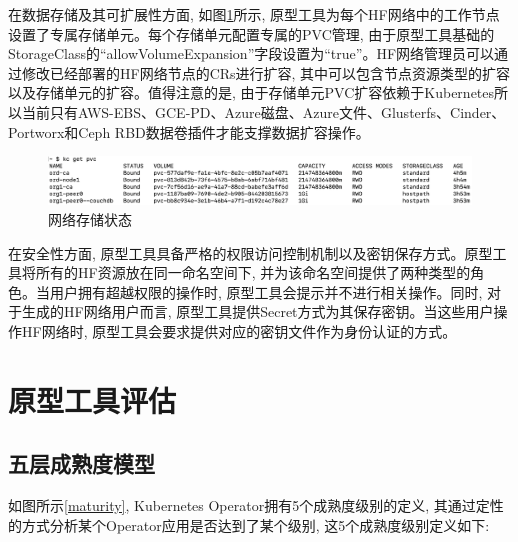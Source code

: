 在数据存储及其可扩展性方面, 如图\ref{db}所示, 原型工具为每个HF网络中的工作节点设置了专属存储单元。每个存储单元配置专属的PVC管理, 由于原型工具基础的StorageClass的“allowVolumeExpansion”字段设置为“true”。HF网络管理员可以通过修改已经部署的HF网络节点的CRs进行扩容, 其中可以包含节点资源类型的扩容以及存储单元的扩容。值得注意的是, 由于存储单元PVC扩容依赖于Kubernetes所以当前只有AWS-EBS、GCE-PD、Azure磁盘、Azure文件、Glusterfs、Cinder、Portworx和Ceph RBD数据卷插件才能支撑数据扩容操作。

\begin{figure}[h] %
    \centering %
    \includegraphics[width=1.0\textwidth]{FIGs/chapter5/db.png} %
    \caption{网络存储状态} %
    \label{db} %
\end{figure}%


在安全性方面, 原型工具具备严格的权限访问控制机制以及密钥保存方式。原型工具将所有的HF资源放在同一命名空间下, 并为该命名空间提供了两种类型的角色。当用户拥有超越权限的操作时, 原型工具会提示并不进行相关操作。同时, 对于生成的HF网络用户而言, 原型工具提供Secret方式为其保存密钥。当这些用户操作HF网络时, 原型工具会要求提供对应的密钥文件作为身份认证的方式。

\section{原型工具评估}

\subsection{五层成熟度模型}

如图所示\ref{maturity}, Kubernetes Operator拥有5个成熟度级别的定义\cite{duan2021case}, 其通过定性的方式分析某个Operator应用是否达到了某个级别, 这5个成熟度级别定义如下:


